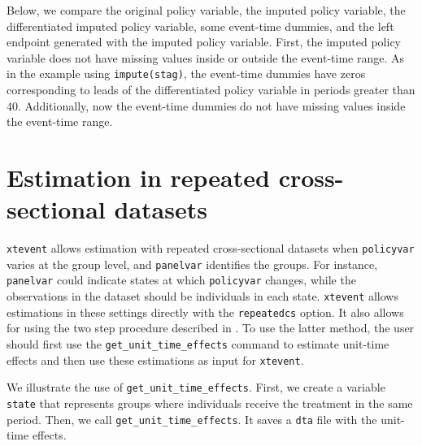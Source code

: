 \documentclass[12pt]{article}
\begin{document}
\begin{stlog}
	\nullskip
\end{stlog}

Below, we compare the original policy variable, the imputed policy variable, the differentiated imputed policy variable, some event-time dummies, and the left endpoint generated with the imputed policy variable.
First, the imputed policy variable does not have missing values inside or outside the event-time range.
As in the example using \texttt{impute(stag)}, the event-time dummies have zeros corresponding to leads of the differentiated policy variable in periods greater than 40. Additionally, now the event-time dummies do not have missing values inside the event-time range.

\begin{stlog}
	\nullskip
\end{stlog}



\section{Estimation in repeated cross-sectional datasets}
\label{sec:xsection}

\texttt{xtevent} allows estimation with repeated cross-sectional datasets when \texttt{policyvar} varies at the group level, and \texttt{panelvar} identifies the groups.
For instance, \texttt{panelvar} could indicate states at which \texttt{policyvar} changes, while the observations in the dataset should be individuals in each state.
\texttt{xtevent} allows estimations in these settings directly with the \texttt{repeatedcs} option.
It also allows for using the two step procedure described in \citet{hansen2007generalized}.
To use the latter method, the user should first use the \texttt{get\_unit\_time\_effects} command to estimate unit-time effects and then use these estimations as input for \texttt{xtevent}.

We illustrate the use of \texttt{get\_unit\_time\_effects}.
First, we create a variable \texttt{state} that represents groups where individuals receive the treatment in the same period.
Then, we call \texttt{get\_unit\_time\_effects}.
It saves a \texttt{dta} file with the unit-time effects.

\begin{stlog}
\nullskip
\end{stlog}
\end{document}
